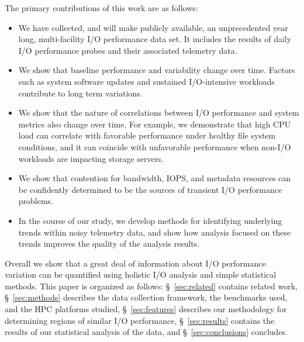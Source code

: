 

The primary contributions of this work are as follows: 
\begin{itemize}[leftmargin=*]
\item We have collected, and will make publicly available, an unprecedented year long, multi-facility
I/O performance data set. It includes the results of daily I/O performance
probes and their associated telemetry data.
\item We show that baseline performance and variability change over time.
Factors such as system software updates and sustained I/O-intensive workloads contribute to long term variations.
\item We show that the nature of correlations between I/O performance and system metrics also change over
time. For example, we demonstrate that high CPU load can correlate with favorable performance under healthy file system conditions, and it can coincide with unfavorable performance when non-I/O workloads are impacting storage servers.
\item We show that contention for bandwidth, IOPS, and metadata resources can be confidently determined to be the sources of transient I/O performance problems.
\item In the course of our study, we develop methods for identifying
underlying trends within noisy telemetry data, and show how analysis focused
on these trends improves the quality of the analysis results.
\end{itemize}
Overall we show that a great deal of information about I/O performance variation can be quantified using holistic I/O analysis and simple statistical methods.
This paper is organized as follows: \S~\ref{sec:related} contains related work, \S~\ref{sec:methods} describes the data collection framework, the benchmarks used, and the HPC platforms studied, \S~\ref{sec:features} describes our methodology for determining regions of similar I/O performance, \S~\ref{sec:results} contains the results of our statistical analysis of the data, and \S~\ref{sec:conclusions} concludes. 

